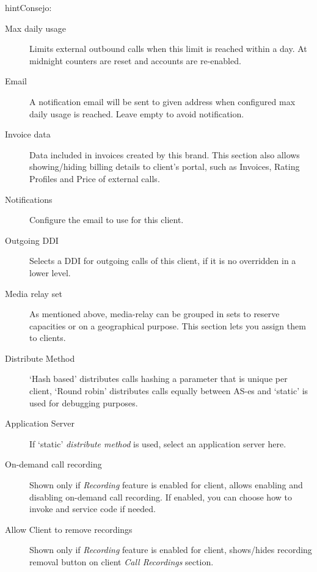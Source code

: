\documentclass[letterpaper,10pt,spanish]{sphinxmanual}
\begin{document}
\begin{notice}{hint}{Consejo:}
\begin{description}
\item[{Max daily usage}] \leavevmode
Limits external outbound calls when this limit is reached within a day. At midnight counters are reset and
accounts are re-enabled.

\item[{Email}] \leavevmode
A notification email will be sent to given address when configured max daily usage is reached. Leave empty to
avoid notification.

\item[{Invoice data}] \leavevmode
Data included in invoices created by this brand. This section also allows showing/hiding billing details to
client's portal, such as Invoices, Rating Profiles and Price of external calls.

\item[{Notifications}] \leavevmode
Configure the email {\hyperref[administration_portal/brand/settings/notification_templates:id1]{}} to use for this client.

\item[{Outgoing DDI}] \leavevmode
Selects a DDI for outgoing calls of this client, if it is no overridden in
a lower level.

\item[{Media relay set}] \leavevmode
As mentioned above, media-relay can be grouped in sets to reserve capacities
or on a geographical purpose. This section lets you assign them to clients.

\item[{Distribute Method}] \leavevmode
`Hash based' distributes calls hashing a parameter that is unique per
client, `Round robin' distributes calls equally between AS-es and
`static' is used for debugging purposes.

\item[{Application Server}] \leavevmode
If `static' \emph{distribute method} is used, select an application server here.

\item[{On-demand call recording}] \leavevmode
Shown only if \emph{Recording} feature is enabled for client, allows enabling and
disabling on-demand call recording. If enabled, you can choose how to invoke
and service code if needed.

\item[{Allow Client to remove recordings}] \leavevmode
Shown only if \emph{Recording} feature is enabled for client, shows/hides recording
removal button on client \emph{Call Recordings} section.

\end{description}
\end{notice}
\end{document}
